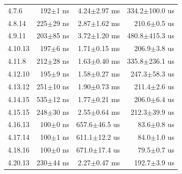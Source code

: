 \begin{longtable}{@{}lrrr@{}}
4.7.6 & 192$\pm$1 ns & 4.24$\pm$2.97 ms & 334.2$\pm$100.0 us \\
4.8.14 & 225$\pm$29 ns & 2.87$\pm$1.62 ms & 210.6$\pm$0.5 us \\
4.9.11 & 203$\pm$85 ns & 3.72$\pm$1.20 ms & 480.8$\pm$415.3 us \\
4.10.13 & 197$\pm$6 ns & 1.71$\pm$0.15 ms & 206.9$\pm$3.8 us \\
4.11.8 & 212$\pm$28 ns & 1.63$\pm$0.40 ms & 335.8$\pm$236.1 us \\
4.12.10 & 195$\pm$9 ns & 1.58$\pm$0.27 ms & 247.3$\pm$58.3 us \\
4.13.12 & 251$\pm$10 ns & 1.90$\pm$0.73 ms & 211.4$\pm$2.6 us \\
4.14.15 & 535$\pm$12 ns & 1.77$\pm$0.21 ms & 206.0$\pm$6.4 us \\
4.15.15 & 248$\pm$30 ns & 2.55$\pm$0.64 ms & 212.3$\pm$39.9 us \\
4.16.13 & 100$\pm$0 ns & 657.6$\pm$46.5 us & 83.6$\pm$0.8 us \\
4.17.14 & 100$\pm$1 ns & 611.1$\pm$12.2 us & 84.0$\pm$1.0 us \\
4.18.16 & 100$\pm$0 ns & 671.0$\pm$17.4 us & 79.5$\pm$0.7 us \\
4.20.13 & 230$\pm$44 ns & 2.27$\pm$0.47 ms & 192.7$\pm$3.9 us \\
\end{longtable}
